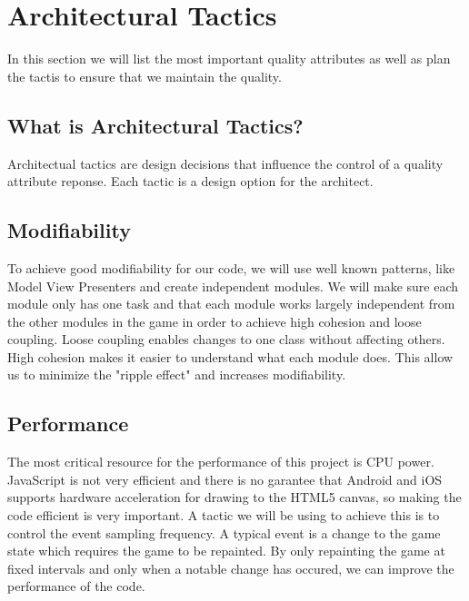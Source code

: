 \section{Architectural Tactics}
In this section we will list the most important quality attributes as well as plan the tactis to 
ensure that we maintain the quality.

\subsection*{What is Architectural Tactics?}
Architectual tactics are design decisions that influence the control of a quality attribute reponse. 
Each tactic is a design option for the architect. \cite{architecturalTactics}

\subsection*{Modifiability}
To achieve good modifiability for our code, we will use well known patterns, like Model View Presenters and create 
independent modules. We will make sure each module only has one task and that each module works 
largely independent from the other modules in the game in order to achieve high cohesion and loose 
coupling. Loose coupling enables changes to one class without affecting others. High cohesion makes 
it easier to understand what each module does. This allow us to minimize the "ripple effect" and 
increases modifiability.

\subsection*{Performance}
The most critical resource for the performance of this project is CPU power. JavaScript is not very 
efficient and there is no garantee that Android and iOS supports hardware acceleration for drawing 
to the HTML5 canvas, so making the code efficient is very important. A tactic we will be using to 
achieve this is to control the event sampling frequency. A typical event is a change to the game 
state which requires the game to be repainted. By only repainting the game at fixed intervals and 
only when a notable change has occured, we can improve the performance of the code.
